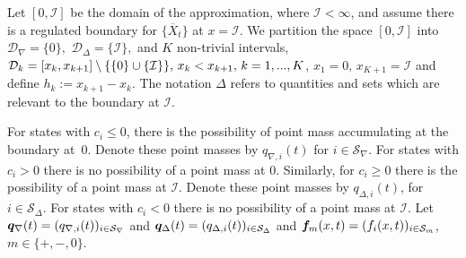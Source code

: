 Let $[0,\mathcal{I}]$ be the domain of the approximation, where $\mathcal{I} < \infty$, and assume there is a regulated boundary for \(\{\overline X_t\}\) at \(x=\mathcal I\). We partition the space $[0,\mathcal{I}]$ into \(\mathcal D_\nabla=\{0\},\) \(\mathcal D_\Delta=\{\mathcal I\},\) and \(K\) non-trivial intervals, \(\mathcal{D}_k=[x_k,x_{k+1}]\setminus \{\{0\}\cup\{\mathcal I\}\},\, x_k<x_{k+1},\, k=1,...,K\), \(x_1=0,\,x_{K+1}=\mathcal I\) and define \(h_k := x_{k+1}-x_k\). The notation \(\Delta\) refers to quantities and sets which are relevant to the boundary at \(\mathcal I\). 

For states with \(c_i\leq 0\), there is the possibility of point mass accumulating at the boundary at~\(0\). Denote these point masses by \(q_{\nabla,i}(t)\) for \(i\in\mathcal S_\nabla\). For states with \(c_i>0\) there is no possibility of a point mass at \(0\). Similarly, for \(c_i\geq 0\) there is the possibility of a point mass at \(\mathcal I\). Denote these point masses by \(q_{\Delta,i}(t)\), for \(i\in\mathcal S_\Delta\). For states with \(c_i<0\) there is no possibility of a point mass at \(\mathcal I\). Let \(\boldsymbol q_\nabla(t)=(q_{\nabla,i}(t))_{i\in\mathcal{S}_\nabla}\) and \(\boldsymbol q_\Delta(t) = (q_{\Delta,i}(t))_{i\in\mathcal{S}_\Delta}\) and \(\boldsymbol f_m(x,t) = (f_i(x,t))_{i\in\mathcal{S}_m}\), \(m\in\{+,-,0\}\). 

